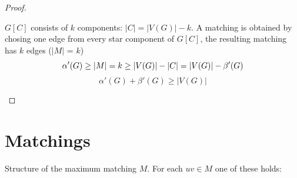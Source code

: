 \documentclass[notitlepage, 12pt]{article}
\begin{document}
\begin{proof}
\begin{itemize}
\begin{figure}[h]
    \centering
  \end{figure}
  $G[C]$ consists of $k$ components: $|C| = |V(G)| - k$. A matching is obtained
  by chosing one edge from every star component of $G[C]$, the resulting matching
  has $k$ edges ($|M|$ = $k$)
  \begin{equation*}
    \alpha'(G) \geq |M| = k \geq |V(G)| -|C| = |V(G)| - \beta'(G)\\
  \end{equation*}
  \begin{equation*}
    \alpha'(G) + \beta'(G) \geq |V(G)|
  \end{equation*}
\end{itemize}
\end{proof}
\newpage
\section{Matchings}
Structure of the maximum matching $M$. For each $uv \in M$ one of these holds:
\end{document}
